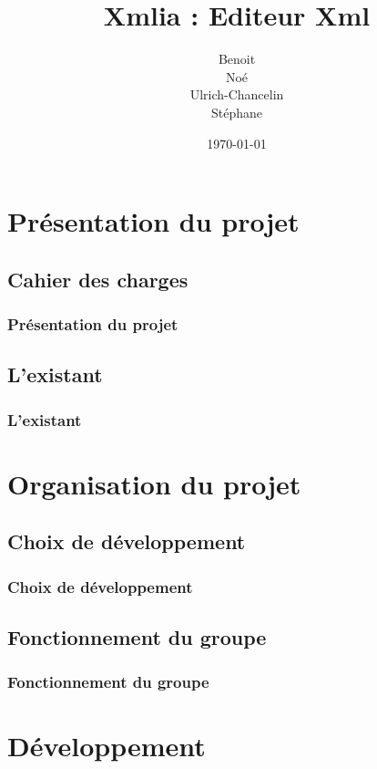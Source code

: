\documentclass{beamer}
\title{Xmlia : Editeur Xml}
\author []{
\bsc{BOIVIN} Benoit\\
\bsc{LE PHILIPPE} Noé\\
\bsc{KEGBA-SANGO-SANGO} Ulrich-Chancelin\\
\bsc{WOUTERS} Stéphane
}
\institute{}
\date{\today}
\begin{document}
	\begin{frame}
		\titlepage
	\end{frame}
		


	\section{Présentation du projet}

	\subsection{Cahier des charges}

	\begin{frame}
		\frametitle{Présentation du projet}
	\end{frame}

	\subsection{L'existant}

	\begin{frame}
		\frametitle{L'existant}
	\end{frame}




	\section{Organisation du projet}

	\subsection{Choix de développement}

	\begin{frame}
		\frametitle{Choix de développement}
	\end{frame}

	\subsection{Fonctionnement du groupe}

	\begin{frame}
		\frametitle{Fonctionnement du groupe}
	\end{frame}




	\section{Développement}
\end{document}
